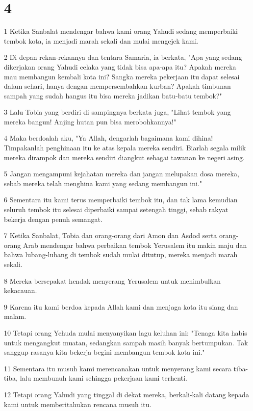 \chapter{4}

\par 1 Ketika Sanbalat mendengar bahwa kami orang Yahudi sedang memperbaiki tembok kota, ia menjadi marah sekali dan mulai mengejek kami.
\par 2 Di depan rekan-rekannya dan tentara Samaria, ia berkata, "Apa yang sedang dikerjakan orang Yahudi celaka yang tidak bisa apa-apa itu? Apakah mereka mau membangun kembali kota ini? Sangka mereka pekerjaan itu dapat selesai dalam sehari, hanya dengan mempersembahkan kurban? Apakah timbunan sampah yang sudah hangus itu bisa mereka jadikan batu-batu tembok?"
\par 3 Lalu Tobia yang berdiri di sampingnya berkata juga, "Lihat tembok yang mereka bangun! Anjing hutan pun bisa merobohkannya!"
\par 4 Maka berdoalah aku, "Ya Allah, dengarlah bagaimana kami dihina! Timpakanlah penghinaan itu ke atas kepala mereka sendiri. Biarlah segala milik mereka dirampok dan mereka sendiri diangkut sebagai tawanan ke negeri asing.
\par 5 Jangan mengampuni kejahatan mereka dan jangan melupakan dosa mereka, sebab mereka telah menghina kami yang sedang membangun ini."
\par 6 Sementara itu kami terus memperbaiki tembok itu, dan tak lama kemudian seluruh tembok itu selesai diperbaiki sampai setengah tinggi, sebab rakyat bekerja dengan penuh semangat.
\par 7 Ketika Sanbalat, Tobia dan orang-orang dari Amon dan Asdod serta orang-orang Arab mendengar bahwa perbaikan tembok Yerusalem itu makin maju dan bahwa lubang-lubang di tembok sudah mulai ditutup, mereka menjadi marah sekali.
\par 8 Mereka bersepakat hendak menyerang Yerusalem untuk menimbulkan kekacauan.
\par 9 Karena itu kami berdoa kepada Allah kami dan menjaga kota itu siang dan malam.
\par 10 Tetapi orang Yehuda mulai menyanyikan lagu keluhan ini: "Tenaga kita habis untuk mengangkut muatan, sedangkan sampah masih banyak bertumpukan. Tak sanggup rasanya kita bekerja begini membangun tembok kota ini."
\par 11 Sementara itu musuh kami merencanakan untuk menyerang kami secara tiba-tiba, lalu membunuh kami sehingga pekerjaan kami terhenti.
\par 12 Tetapi orang Yahudi yang tinggal di dekat mereka, berkali-kali datang kepada kami untuk memberitahukan rencana musuh itu.

